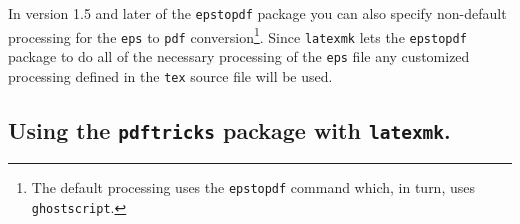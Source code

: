 \documentclass[11pt]{article}
\begin{document}

In version 1.5 and later of the \texttt{epstopdf} package you can also specify non-default processing for the \texttt{eps} to \texttt{pdf} conversion\footnote{The default processing uses the \texttt{epstopdf} command which, in turn, uses \texttt{ghostscript}.}. Since \texttt{latexmk} lets the \texttt{epstopdf} package to do all of the necessary processing of the \texttt{eps} file any customized processing defined in the \texttt{tex} source file will be used.


\subsection{Using the \texttt{pdftricks} package with \texttt{latexmk}.}
\end{document}

